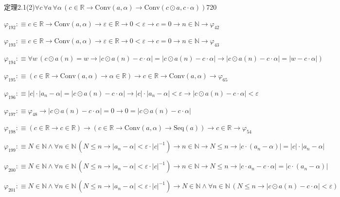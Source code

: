 \begin{fullproof}{定理2.1(2)}{$\forall c\,\forall a\,\forall \alpha\,(c \in \mathbb{R} \to \mathrm{Conv}(a,\alpha) \to \mathrm{Conv}(c \odot a,c \cdot \alpha))$}{720}
\begin{abbrevlist}
\item $\varphi_{192} :\equiv c \in \mathbb{R} \to \mathrm{Conv}(a,\alpha) \to \varepsilon \in \mathbb{R} \to 0 < \varepsilon \to c = 0 \to n \in \mathbb{N} \to \varphi_{42}$
\item $\varphi_{193} :\equiv c \in \mathbb{R} \to \mathrm{Conv}(a,\alpha) \to \varepsilon \in \mathbb{R} \to 0 < \varepsilon \to c = 0 \to n \in \mathbb{N} \to \varphi_{43}$
\item $\varphi_{194} :\equiv \forall w\,(c \odot a(n) = w \to \lvert c \odot a(n) - c \cdot \alpha \rvert = \lvert c \odot a(n) - c \cdot \alpha \rvert \to \lvert c \odot a(n) - c \cdot \alpha \rvert = \lvert w - c \cdot \alpha \rvert)$
\item $\varphi_{195} :\equiv (c \in \mathbb{R} \to \mathrm{Conv}(a,\alpha) \to \alpha \in \mathbb{R}) \to c \in \mathbb{R} \to \mathrm{Conv}(a,\alpha) \to \varphi_{65}$
\item $\varphi_{196} :\equiv \lvert c \rvert \cdot \lvert a_{n} - \alpha \rvert = \lvert c \odot a(n) - c \cdot \alpha \rvert \to \lvert c \rvert \cdot \lvert a_{n} - \alpha \rvert < \varepsilon \to \lvert c \odot a(n) - c \cdot \alpha \rvert < \varepsilon$
\item $\varphi_{197} :\equiv \varphi_{48} \to \lvert c \odot a(n) - c \cdot \alpha \rvert = 0 \to 0 = \lvert c \odot a(n) - c \cdot \alpha \rvert$
\item $\varphi_{198} :\equiv (c \in \mathbb{R} \to c \in \mathbb{R}) \to (c \in \mathbb{R} \to \mathrm{Conv}(a,\alpha) \to \mathrm{Seq}(a)) \to c \in \mathbb{R} \to \varphi_{54}$
\item $\varphi_{199} :\equiv N \in \mathbb{N} \land \forall n \in \mathbb{N}\,(N \leq n \to \lvert a_{n} - \alpha \rvert < \varepsilon \cdot \lvert c \rvert^{-1}) \to n \in \mathbb{N} \to N \leq n \to \lvert c \cdot (a_{n} - \alpha) \rvert = \lvert c \rvert \cdot \lvert a_{n} - \alpha \rvert$
\item $\varphi_{200} :\equiv N \in \mathbb{N} \land \forall n \in \mathbb{N}\,(N \leq n \to \lvert a_{n} - \alpha \rvert < \varepsilon \cdot \lvert c \rvert^{-1}) \to n \in \mathbb{N} \to N \leq n \to \lvert c \cdot a_{n} - c \cdot \alpha \rvert = \lvert c \cdot (a_{n} - \alpha) \rvert$
\item $\varphi_{201} :\equiv N \in \mathbb{N} \land \forall n \in \mathbb{N}\,(N \leq n \to \lvert a_{n} - \alpha \rvert < \varepsilon \cdot \lvert c \rvert^{-1}) \to N \in \mathbb{N} \land \forall n \in \mathbb{N}\,(N \leq n \to \lvert c \odot a(n) - c \cdot \alpha \rvert < \varepsilon)$

\end{abbrevlist}
\end{fullproof}
